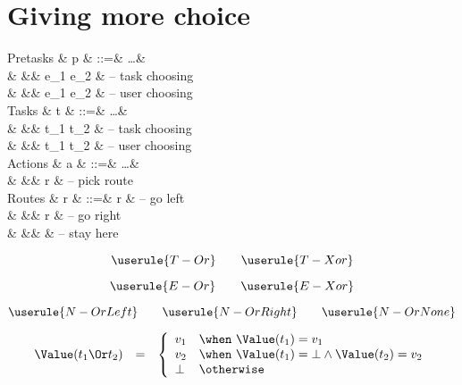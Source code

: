 
\section{Giving more choice}

\begin{grammar}
  Pretasks
    & p & ::=& \ldots       & \\
    &   &\mid& e_1 \Or e_2  & – task choosing \\
    &   &\mid& e_1 \Xor e_2 & – user choosing \\
  Tasks
    & t & ::=& \ldots       & \\
    &   &\mid& t_1 \Or t_2  & – task choosing \\
    &   &\mid& t_1 \Xor t_2 & – user choosing \\
  Actions
    & a & ::=& \ldots       & \\
    &   &\mid& \Pick r      & – pick route \\
  Routes
    & r & ::=& \Left r      & – go left \\
    &   &\mid& \Right r     & – go right \\
    &   &\mid& \Here        & – stay here \\
\end{grammar}

\begin{equation*}
  \userule{T-Or} \qquad \userule{T-Xor}
\end{equation*}

\begin{equation*}
  \userule{E-Or} \qquad \userule{E-Xor}
\end{equation*}

\begin{equation*}
  \userule{N-OrLeft} \qquad \userule{N-OrRight} \qquad \userule{N-OrNone}
\end{equation*}

\begin{equation*}
  \begin{array}{lcl}
    \Value(t_1 \Or t_2) &=& \left\{
      \begin{array}{ll}
        v_1  & \when\ \Value(t_1) = v_1 \\
        v_2  & \when\ \Value(t_1) = \bot \land \Value(t_2) = v_2 \\
        \bot & \otherwise
      \end{array}
    \right.
  \end{array}
\end{equation*}

